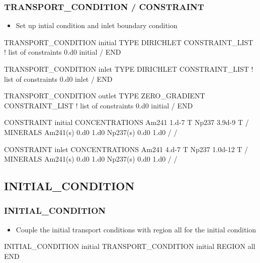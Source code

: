 \documentclass{beamer}
\newcommand\bluecomment[1]{{{\color{blue} #1}}}
\newcommand\greencomment[1]{{{\color{green} #1}}}
\begin{document}
\begin{frame}\frametitle{TRANSPORT\_CONDITION / CONSTRAINT}

\begin{itemize}
  \item Set up intial condition and inlet boundary condition
\end{itemize}

{
\begin{semiverbatim}

TRANSPORT_CONDITION initial
  TYPE DIRICHLET
  CONSTRAINT_LIST       \bluecomment{! list of constraints}
    0.d0 initial  
  /
END

TRANSPORT_CONDITION inlet      
  TYPE DIRICHLET
  CONSTRAINT_LIST       \bluecomment{! list of constraints}
    0.d0 inlet  
  /
END
\end{semiverbatim}
}

\newpage
{\small
\begin{semiverbatim}

TRANSPORT_CONDITION outlet      
  TYPE ZERO_GRADIENT
  CONSTRAINT_LIST       \bluecomment{! list of constraints}
    0.d0 initial  
  /
END
	
CONSTRAINT initial
  CONCENTRATIONS
    Am241  1.d-7  T 
    Np237  3.9d-9  T 
  /
  MINERALS
    Am241(s) 0.d0 1.d0
    Np237(s) 0.d0 1.d0
  /
/
\end{semiverbatim}
}

\newpage
{
	\begin{semiverbatim}
		
CONSTRAINT inlet
  CONCENTRATIONS
    Am241  4.d-7  T 
    Np237  1.0d-12  T 
  /
  MINERALS
    Am241(s) 0.d0 1.d0
    Np237(s) 0.d0 1.d0
  /
/


\end{semiverbatim}
}

\end{frame}




\subsection{INITIAL\_CONDITION}

\begin{frame}[fragile]\frametitle{INITIAL\_CONDITION}

\begin{itemize}
\item Couple the \greencomment{initial} transport conditions with region \greencomment{all} for the initial condition
\end{itemize}

\begin{semiverbatim}

INITIAL_CONDITION initial
  TRANSPORT_CONDITION initial
  REGION all
END

\end{semiverbatim}

\end{frame}
\end{document}
